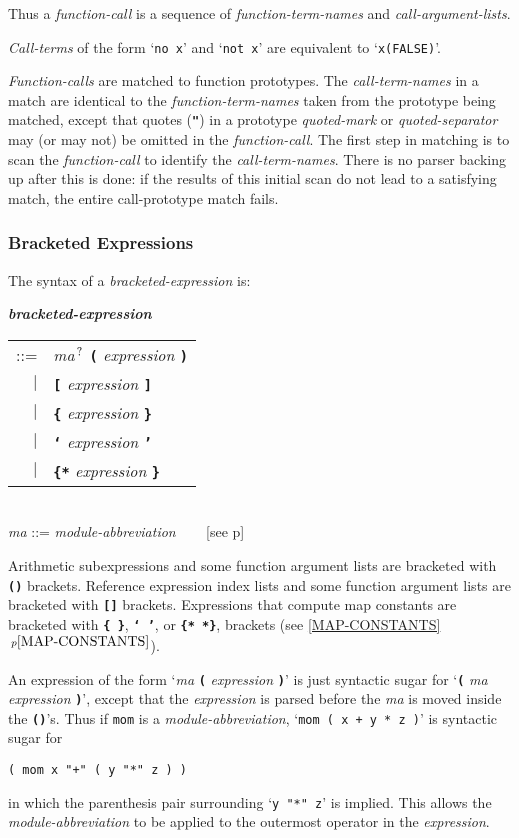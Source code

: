 \documentclass[12pt]{article}
\newcommand{\TT}[1]{{\tt \bfseries #1}}
\newcommand{\QMARK}{{$^{\,\mbox{\footnotesize ?}}$}}
\newcommand{\emkey}[1]{{\em \bfseries #1}}
\newcommand{\itemref}[1]{\ref{#1}$\,^{p\pageref{#1}}$}
\newcommand{\pagref}[1]{p\pageref{#1}}
\newenvironment{indpar}[1][0.3in]%
	{\begin{list}{}%
		     {\setlength{\itemsep}{0in}%
		      \setlength{\topsep}{0in}%
		      \setlength{\parsep}{1ex}%
		      \setlength{\labelwidth}{#1}%
		      \setlength{\leftmargin}{#1}%
		      \addtolength{\leftmargin}{\labelsep}}%
	 \item}%
	{\end{list}}
\begin{document}
Thus a {\em function-call} is a sequence of {\em function-term-names}
and {\em call-argument-lists}.

{\em Call-terms} of the form `{\tt no x}' and `{\tt not x}' are
equivalent to `{\tt x(FALSE)}'.

{\em Function-calls} are matched to function prototypes.  The
{\em call-term-names} in a match are identical to the
{\em function-term-names} taken from the prototype being matched, except
that quotes (\TT{"}) in a prototype {\em quoted-mark} or
{\em quoted-separator} may (or may not) be omitted in the
{\em function-call}.  The first
step in matching is to scan the {\em function-call} to identify the
{\em call-term-names}.  There is no parser backing up after this is
done: if the results of this initial scan do not lead to a satisfying
match, the entire call-prototype match fails.

\subsubsection{Bracketed Expressions}
\label{BRACKETED-EXPRESSIONS}

The syntax of a {\em bracketed-expression} is:

\begin{indpar}
\emkey{bracketed-expression}\label{BRACKETED-EXPRESSION}
    \begin{tabular}[t]{@{}rl}
    ::= & {\em ma}\QMARK{} \TT{(} {\em expression} \TT{)} \\
    $|$ & \TT{[} {\em expression} \TT{]} \\
    $|$ & \TT{\{} {\em expression} \TT{\}} \\
    $|$ & \TT{`} {\em expression} \TT{'} \\
    $|$ & \TT{\{*} {\em expression} \TT{*\}} \\
    \end{tabular}
\\[0.5ex]
{\em ma} ::= {\em module-abbreviation} ~~~ [see \pagref{MODULE-ABBREVIATION}]
\end{indpar}

Arithmetic subexpressions and some function argument lists are bracketed
with \TT{()} brackets.  Reference expression index lists and some function
argument lists are bracketed with \TT{[]} brackets.
Expressions that compute map constants
are bracketed with \TT{\{~\}}, \TT{`~'}, or \TT{\{*~*\}},
brackets (see \itemref{MAP-CONSTANTS}).

An expression of the form `{\em ma} \TT{(} {\em expression} \TT{)}' is
just syntactic sugar for `\TT{(} {\em ma} {\em expression} \TT{)}', except
that the {\em expression} is parsed before the {\em ma} is moved inside the
\TT{()}'s.  Thus if {\tt mom} is a {\em module-abbreviation},
`{\tt mom ( x + y * z )}' is syntactic sugar for \\
\centerline{\tt ( mom x "+" ( y "*" z ) )}
in which the parenthesis pair surrounding `{\tt y "*" z}' is implied.
This allows the {\em module-abbre\-via\-tion} to be applied to the outermost
operator in the {\em expression}.
\end{document}
